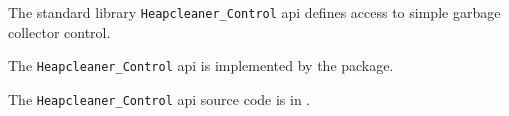 
The standard library {\tt Heapcleaner\_Control} api defines access to simple garbage collector control.

The {\tt Heapcleaner\_Control} api is implemented by the  package.

The {\tt Heapcleaner\_Control} api source code is in .
